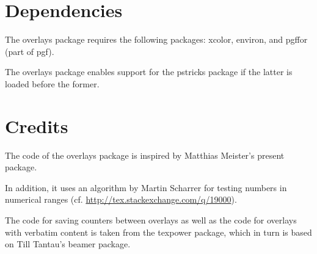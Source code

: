 \documentclass[a4paper]{ltxdoc}
\begin{document}
\section{Dependencies}

The \textsf{overlays} package requires the following packages: \textsf{xcolor},
\textsf{environ}, and \textsf{pgffor} (part of \textsf{pgf}).

The \textsf{overlays} package enables support for the \textsf{pstricks} package
if the latter is loaded before the former.

\section{Credits}

The code of the \textsf{overlays} package is inspired by Matthias Meister's
\textsf{present} package.

In addition, it uses an algorithm by Martin Scharrer for testing numbers in
numerical ranges (cf. \url{http://tex.stackexchange.com/q/19000}).

The code for saving counters between overlays as well as the code for overlays
with verbatim content is taken from the \textsf{texpower} package, which in turn
is based on Till Tantau's \textsf{beamer} package.
\end{document}
